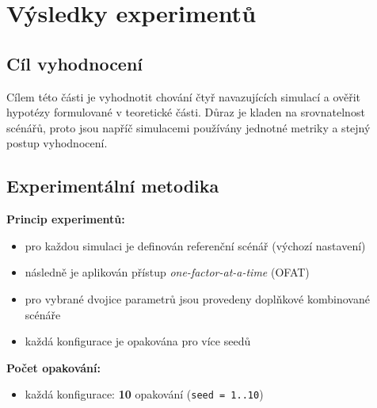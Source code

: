 \section{Výsledky experimentů}

\subsection{Cíl vyhodnocení}

Cílem této části je vyhodnotit chování čtyř navazujících simulací a ověřit hypotézy formulované v teoretické části. Důraz je kladen na srovnatelnost scénářů, proto jsou napříč simulacemi používány jednotné metriky a stejný postup vyhodnocení.

\subsection{Experimentální metodika}

\textbf{Princip experimentů:}
\begin{itemize}
\item pro každou simulaci je definován referenční scénář (výchozí nastavení)
\item následně je aplikován přístup \textit{one-factor-at-a-time} (OFAT)
\item pro vybrané dvojice parametrů jsou provedeny doplňkové kombinované scénáře
\item každá konfigurace je opakována pro více seedů
\end{itemize}

\textbf{Počet opakování:}
\begin{itemize}
\item každá konfigurace: \textbf{10} opakování (\texttt{seed = 1..10})
\end{itemize}


